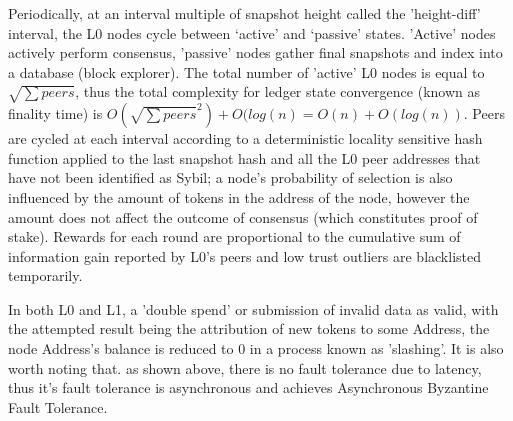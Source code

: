 \documentclass{article}
\begin{document}
Periodically, at an interval multiple of snapshot height called the 'height-diff' interval, the L0 nodes cycle between ‘active’ and ‘passive’ states. 'Active' nodes actively perform consensus, 'passive' nodes gather final snapshots and index into a database (block explorer). The total number of 'active' L0 nodes is equal to $\sqrt{\sum peers}$, thus the total complexity for ledger state convergence (known as finality time) is $O(\sqrt{\sum peers}^2) + O(log(n)= O(n) + O(log(n))$. Peers are cycled at each interval according to a deterministic locality sensitive hash function applied to the last snapshot hash and all the L0 peer addresses that have not been identified as Sybil; a node's probability of selection is also influenced by the amount of tokens in the address of the node, however the amount does not affect the outcome of consensus (which constitutes proof of stake). Rewards for each round are proportional to the cumulative sum of information gain reported by L0’s peers and low trust outliers are blacklisted temporarily.

In both L0 and L1, a 'double spend' or submission of invalid data as valid, with the attempted result being the attribution of new tokens to some Address, the node Address's balance is reduced to 0 in a process known as 'slashing'. It is also worth noting that. as shown above, there is no fault tolerance due to latency, thus it's fault tolerance is asynchronous and achieves Asynchronous Byzantine Fault Tolerance.
\end{document}
